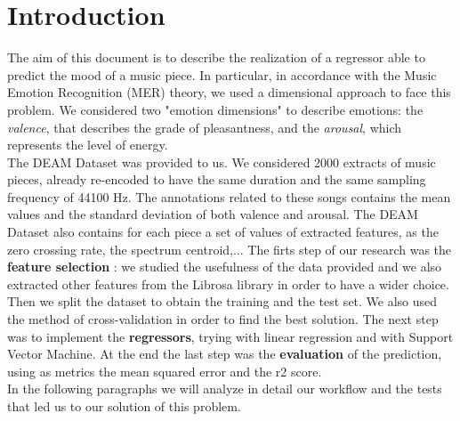 \documentclass[12pt,a4paper]{book}
\begin{document}
\section{Introduction}


	The aim of this document is to describe the realization of a regressor able to predict the mood of a music piece. In particular, in accordance with the Music Emotion Recognition (MER) theory, we used a dimensional approach to face this problem. We considered two "emotion dimensions" to describe emotions: the \textit{valence}, that describes the grade of pleasantness, and the \textit{arousal}, which represents the level of energy.\\
	The DEAM Dataset was provided to us. We considered 2000 extracts of music pieces, already re-encoded to have the same duration and the same sampling frequency of 44100 Hz. The annotations related to these songs contains the mean values and the standard deviation of both valence and arousal. The DEAM Dataset also contains for each piece a set of values of extracted features, as the zero crossing rate, the spectrum centroid,... The firts step of our research was the \textbf{feature selection} : we studied the usefulness of the data provided and we also extracted other features from the Librosa library in order to have a wider choice. Then we split the dataset to obtain the training and the test set. We also used the method of cross-validation in order to find the best solution. The next step was to implement the \textbf{regressors}, trying with linear regression and with Support Vector Machine. At the end the last step was the \textbf{evaluation} of the prediction, using as metrics the mean squared error and the r2 score.\\In the following paragraphs we will analyze in detail our workflow and the tests that led us to our solution of this problem.
\end{document}
